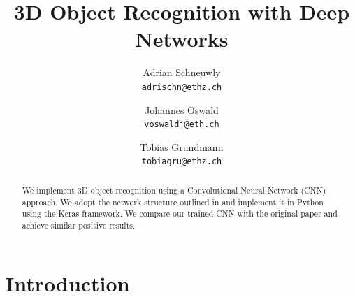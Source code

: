 \documentclass[10pt,twocolumn,letterpaper]{article}
\begin{document}
\title{3D Object Recognition with Deep Networks}

\author{Adrian Schneuwly\\
{\tt\small adrischn@ethz.ch}
\and
Johannes Oswald\\
{\tt\small voswaldj@eth.ch}
\and
Tobias Grundmann\\
{\tt\small tobiagru@ethz.ch}
}

\maketitle

\begin{abstract}
 
   
  We implement 3D object recognition using a Convolutional Neural Network (CNN) approach. We adopt the network structure 
  outlined in \cite{voxnet} and implement it in Python using the Keras framework. We compare our trained CNN
  with the original paper and achieve similar positive results.

\end{abstract}

\section{Introduction}


\end{document}
